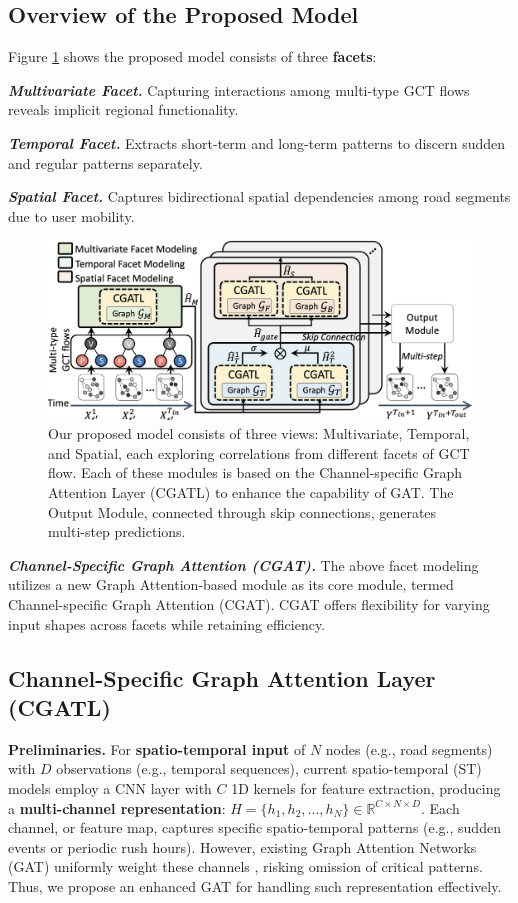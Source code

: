 \documentclass[letterpaper]{article} %
\begin{document}
\subsection{Overview of the Proposed Model}
Figure \ref{fig:model} shows the proposed model consists of three \textbf{facets}:

\textbf{\textit{Multivariate Facet.}} Capturing interactions among multi-type GCT flows reveals implicit regional functionality.

\textbf{\textit{Temporal Facet.}} Extracts short-term and long-term patterns to discern sudden and regular patterns separately.

\textbf{\textit{Spatial Facet.}} Captures bidirectional spatial dependencies among road segments due to user mobility.
\begin{figure}[h]
\centering
\includegraphics[width=0.9\linewidth]{Figure/model.png}
\caption{Our proposed model consists of three views: Multivariate, Temporal, and Spatial, each exploring correlations from different facets of GCT flow. Each of these modules is based on the Channel-specific Graph Attention Layer (CGATL) to enhance the capability of GAT. The Output Module, connected through skip connections, generates multi-step predictions.}
\label{fig:model}
\end{figure}

\textbf{\textit{Channel-Specific Graph Attention (CGAT).}} The above facet modeling utilizes a new Graph Attention-based module as its core module, termed Channel-specific Graph Attention (CGAT). CGAT offers flexibility for varying input shapes across facets while retaining efficiency.
\subsection{Channel-Specific Graph Attention Layer (CGATL)}
\noindent \textbf{Preliminaries.}
For \textbf{spatio-temporal input} of $N$ nodes (e.g., road segments) with $D$ observations (e.g., temporal sequences), current spatio-temporal (ST) models \cite{wu2019graph, wu2020connecting, han2021dynamic, ye2022learning} employ a CNN layer with $C$ 1D kernels for feature extraction, producing a \textbf{multi-channel representation}: $H=\{h_{1},h_{2},\dots,h_{N}\} \in \mathbb{R}^{C \times N \times D}$. Each channel, or feature map, captures specific spatio-temporal patterns (e.g., sudden events or periodic rush hours). However, existing Graph Attention Networks (GAT) \cite{velivckovic2018graph,brody2022how} uniformly weight these channels \cite{zhang2020spatial}, risking omission of critical patterns. Thus, we propose an enhanced GAT for handling such representation effectively.
\end{document}
